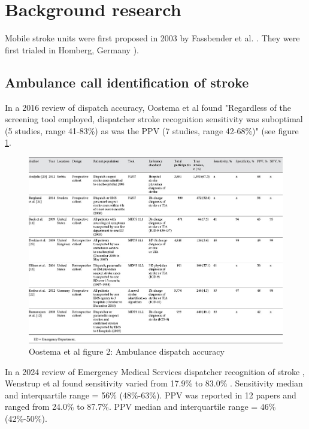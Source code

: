 \section{Background research}

Mobile stroke units were first proposed in 2003 by Fassbender et al. \cite{fassbender_mobile_2003}. They were first trialed in Homberg, Germany  \cite{walter_diagnosis_2012}).



\subsection{Ambulance call identification of stroke}

In a 2016 review of dispatch accuracy, Oostema et al \cite{oostema_dispatcher_2016} found "Regardless of the screening tool employed, dispatcher stroke recognition sensitivity was suboptimal (5 studies, range 41-83\%) as was the PPV (7 studies, range 42-68\%)" (see figure \ref{fig:oostema}.

\begin{figure}
    \centering
    \includegraphics[width=0.9\linewidth]{images_background/oosetema_dispatch_accuracy}
    \caption{Oostema et al figure 2: Ambulance dispatch accuracy}
    \label{fig:oostema}
\end{figure}

In a 2024 review of Emergency Medical Services dispatcher recognition of stroke \cite{wenstrup_emergency_2024}, Wenstrup et al found sensitivity varied from 17.9\% to 83.0\% . Sensitivity median and interquartile range = 56\% (48\%-63\%). PPV was reported in 12 papers and ranged from 24.0\% to 87.7\%. PPV median and interquartile range = 46\% (42\%-50\%).

